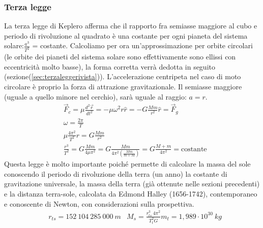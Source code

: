 \documentclass[10pt,a4paper]{article}
\begin{document}
\subsubsection{Terza legge}\label{sec:terzalegge}
La terza legge di Keplero afferma che il rapporto fra semiasse maggiore al cubo e periodo di rivoluzione al quadrato è una costante per ogni pianeta del sistema solare:$\frac{a^3}{T^2}$ = costante. Calcoliamo per ora un'approssimazione per orbite circolari (le orbite dei pianeti del sistema solare sono effettivamente sono ellissi con eccentricità molto basse), la forma corretta verrà dedotta in seguito (sezione(\ref{sec:terzaleggerivista})). L'accelerazione centripeta nel caso di moto circolare è proprio la forza di attrazione gravitazionale. Il semiasse maggiore (uguale a quello minore nel cerchio), sarà uguale al raggio: $a = r$.
\begin{align*}
	&\vec{F}_c = \mu\frac{d^2\vec{r}}{dt^2}= -\mu\omega^2 r \hat{r} = -G\frac{Mm}{r^2} \hat{r}=\vec{F}_g\\
	&\omega =\frac{2\pi}{T}\\
	&\mu\frac{4\pi^2}{T^2} r  = G\frac{Mm}{r^2}\\
	&\frac{r^3}{T^2} = G\frac{Mm}{4 \mu \pi^2}= G\frac{Mm}{4 \pi^2 (\frac{Mm}{m+M})}= G\frac{M+m}{4 \pi^2} = \text{costante}
\end{align*} 
Questa legge è molto importante poiché permette di calcolare la massa del sole conoscendo il periodo di rivoluzione della terra (un anno) la costante di gravitazione universale, la massa della terra (già ottenute nelle sezioni precedenti) e la distanza terra-sole, calcolata da Edmond Halley (1656-1742), contemporaneo e conoscente di Newton, con considerazioni sulla prospettiva.
\begin{align*}
	&r_{ts} = 152\ 104\ 285\ 000\ m
	&M_s = \frac{r_{ts}^3\ 4 \pi^2}{T_t^2 G}m_t= 1,989 \cdot 10 ^{30} \ kg
\end{align*}
\end{document}
